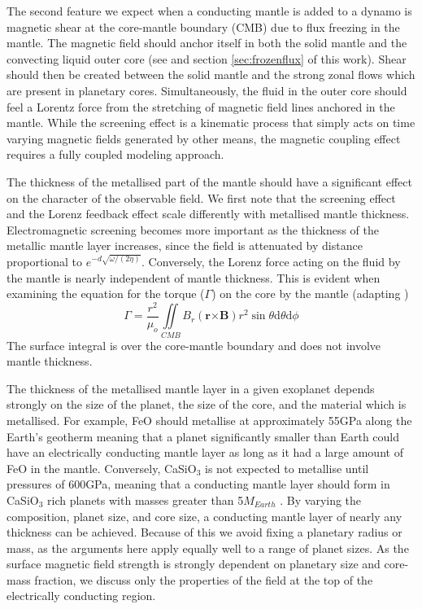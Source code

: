 The second feature we expect when a conducting mantle is added to a dynamo is magnetic shear at the core-mantle boundary (CMB) due to flux freezing in the mantle. The magnetic field should anchor itself in both the solid mantle and the convecting liquid outer core (see \citet{moffatt1978} and section \ref{sec:frozenflux} of this work). Shear should then be created between the solid mantle and the strong zonal flows which are present in planetary cores. Simultaneously, the fluid in the outer core should feel a Lorentz force from the stretching of magnetic field lines anchored in the mantle. While the screening effect is a kinematic process that simply acts on time varying magnetic fields generated by other means, the magnetic coupling effect requires a fully coupled modeling approach.

The thickness of the metallised part of the mantle should have a significant effect on the character of the observable field. We first note that the screening effect and the Lorenz feedback effect scale differently with metallised mantle thickness. Electromagnetic screening becomes more important as the thickness of the metallic mantle layer increases, since the field is attenuated by distance proportional to $e^{-d\sqrt{\omega/(2 \eta)}}$. Conversely, the Lorenz force acting on the fluid by the mantle is nearly independent of mantle thickness. This is evident when examining the equation for the torque ($\Gamma$) on the core by the mantle (adapting \citep{gubbins1987})
\begin{equation}
\Gamma=\frac{r^{2}}{\mu_{o}}\iint\limits_{CMB}B_r\left(\mathbf{r}\mathbf{\mathbf{\times}}\mathbf{B}\right)r^{2} \sin\theta \mathrm{d}\theta \mathrm{d}\phi
\end{equation}
The surface integral is over the core-mantle boundary and does not involve mantle thickness. 

The thickness of the metallised mantle layer in a given exoplanet depends strongly on the size of the planet, the size of the core, and the material which is metallised. For example, FeO should metallise at approximately 55GPa along the Earth's geotherm \citep{ohta2012} meaning that a planet significantly smaller than Earth could have an electrically conducting mantle layer as long as it had a large amount of FeO in the mantle. Conversely, CaSiO$_{3}$ is not expected to metallise until pressures of 600GPa, meaning that a conducting mantle layer should form in CaSiO$_{3}$ rich planets with masses greater than 5$M_{Earth}$ \citep{tsuchiya2011}. By varying the composition, planet size, and core size, a conducting mantle layer of nearly any thickness can be achieved. Because of this we avoid fixing a planetary radius or mass, as the arguments here apply equally well to a range of planet sizes. As the surface magnetic field strength is strongly dependent on planetary size and core-mass fraction, we discuss only the properties of the field at the top of the electrically conducting region.
 
